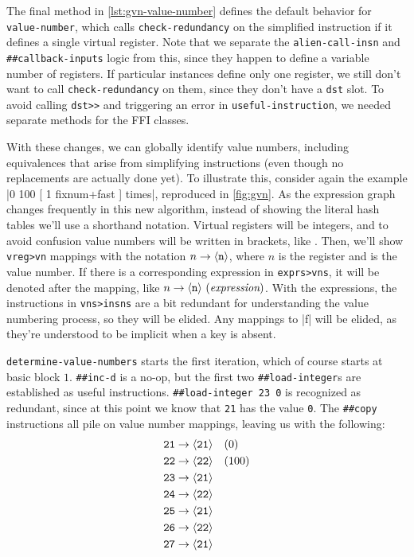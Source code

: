 The final method in \cref{lst:gvn-value-number} defines the default behavior
for \Verb|value-number|, which calls \Verb|check-redundancy| on the
simplified instruction if it defines a single virtual register.  Note that we
separate the \Verb|alien-call-insn| and \Verb|##callback-inputs| logic from
this, since they happen to define a variable number of registers.  If
particular instances define only one register, we still don't want to call
\Verb|check-redundancy| on them, since they don't have a \Verb|dst| slot.
To avoid calling \Verb|dst>>| and triggering an error in
\Verb|useful-instruction|, we needed separate methods for the \gls{FFI}
classes.


With these changes, we can globally identify value numbers, including
equivalences that arise from simplifying instructions (even though no
replacements are actually done yet).  To illustrate this, consider again the
example
%
\factor|0 100 [ 1 fixnum+fast ] times|,
%
reproduced in \cref{fig:gvn}.  As the expression graph changes frequently in
this new algorithm, instead of showing the literal hash tables we'll use a
shorthand notation.  Virtual registers will be integers, and to avoid confusion
value numbers will be written in brackets, like .  Then, we'll show
\Verb|vreg>vn| mappings with the notation $n\to\langle\texttt{n}\rangle$, where $n$ is the
register and  is the value number.  If there is a corresponding
expression in \Verb|exprs>vns|, it will be denoted after the mapping, like
$n\to\langle\texttt{n}\rangle~(\textit{expression})$.  With the expressions, the instructions in
\Verb|vns>insns| are a bit redundant for understanding the value numbering
process, so they will be elided.  Any mappings to \factor|f| will be elided, as
they're understood to be implicit when a key is absent.


\Verb|determine-value-numbers| starts the first iteration, which of course
starts at basic block $1$.  \Verb|##inc-d| is a no-op, but the first two
\Verb|##load-integer|s are established as useful instructions.
%
\Verb|##load-integer 23 0|
%
is recognized as redundant, since at this point we know that \Verb|21| has
the value \Verb|0|.  The \Verb|##copy| instructions all pile on value
number mappings, leaving us with the following:
%
\begin{align*}
  \texttt{21} &\to \langle\texttt{21}\rangle \quad (0)  \\
  \texttt{22} &\to \langle\texttt{22}\rangle \quad (100)\\
  \texttt{23} &\to \langle\texttt{21}\rangle            \\
  \texttt{24} &\to \langle\texttt{22}\rangle            \\
  \texttt{25} &\to \langle\texttt{21}\rangle            \\
  \texttt{26} &\to \langle\texttt{22}\rangle            \\
  \texttt{27} &\to \langle\texttt{21}\rangle
\end{align*}

